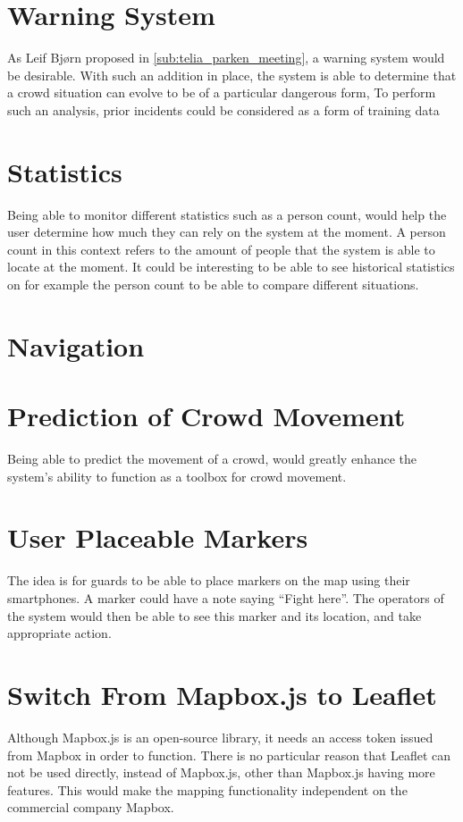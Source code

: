 \section{Warning System}
As Leif Bjørn proposed in \cref{sub:telia_parken_meeting}, a warning system would be desirable. With such an addition in place, the system is able to determine that a crowd situation can  evolve to be of a particular dangerous form, To perform such an analysis, prior incidents could be considered as a form of training data

\section{Statistics}
Being able to monitor different statistics such as a person count, would help the user determine how much they can rely on the system at the moment. A person count in this context refers to the amount of people that the system is able to locate at the moment. It could be interesting to be able to see historical statistics on for example the person count to be able to compare different situations.

\section{Navigation}

\section{Prediction of Crowd Movement}
Being able to predict the movement of a crowd, would greatly enhance the system's ability to function as a toolbox for crowd movement.

\section{User Placeable Markers}
The idea is for guards to be able to place markers on the map using their smartphones. A marker could have a note saying \enquote{Fight here}. The operators of the system would then be able to see this marker and its location, and take appropriate action.

\section{Switch From Mapbox.js to Leaflet}
Although Mapbox.js is an open-source library, it needs an access token issued from Mapbox in order to function. There is no particular reason that Leaflet can not be used directly, instead of Mapbox.js, other than Mapbox.js having more features. This would make the mapping functionality independent on the commercial company Mapbox.

